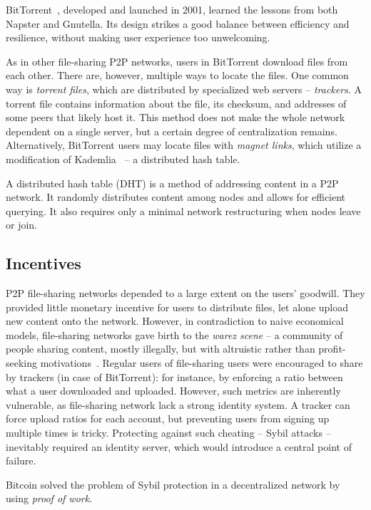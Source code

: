 BitTorrent~\cite{Pouwelse2005}, developed and launched in 2001, learned the lessons from both Napster and Gnutella.
Its design strikes a good balance between efficiency and resilience, without making user experience too unwelcoming.

As in other file-sharing P2P networks, users in BitTorrent download files from each other.
There are, however, multiple ways to locate the files.
One common way is \textit{torrent files}, which are distributed by specialized web servers -- \textit{trackers}.
A torrent file contains information about the file, its checksum, and addresses of some peers that likely host it.
This method does not make the whole network dependent on a single server, but a certain degree of centralization remains.
Alternatively, BitTorrent users may locate files with \textit{magnet links}, which utilize a modification of Kademlia~\cite{Maymounkov2002} -- a distributed hash table.

A distributed hash table (DHT) is a method of addressing content in a P2P network.
It randomly distributes content among nodes and allows for efficient querying.
It also requires only a minimal network restructuring when nodes leave or join.


\subsection{Incentives}

P2P file-sharing networks depended to a large extent on the users' goodwill.
They provided little monetary incentive for users to distribute files, let alone upload new content onto the network.
However, in contradiction to naive economical models, file-sharing networks gave birth to the \textit{warez scene} -- a community of people sharing content, mostly illegally, but with altruistic rather than profit-seeking motivations~\cite{Rehn2004}.
Regular users of file-sharing users were encouraged to share by trackers (in case of BitTorrent): for instance, by enforcing a ratio between what a user downloaded and uploaded.
However, such metrics are inherently vulnerable, as file-sharing network lack a strong identity system.
A tracker can force upload ratios for each account, but preventing users from signing up multiple times is tricky.
Protecting against such cheating -- Sybil attacks -- inevitably required an identity server, which would introduce a central point of failure.

Bitcoin solved the problem of Sybil protection in a decentralized network by using \textit{proof of work}.



